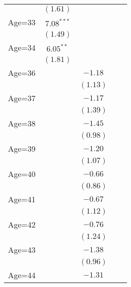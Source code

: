 \documentclass[fullpage]{paper}
\begin{document}
\begin{center}
\begin{longtable}{l c c c c }
            & $(1.61)$      &               &               &               \\
Age=33      & $7.08^{***}$  &               &               &               \\
            & $(1.49)$      &               &               &               \\
Age=34      & $6.05^{**}$   &               &               &               \\
            & $(1.81)$      &               &               &               \\
Age=36      &               & $-1.18$       &               &               \\
            &               & $(1.13)$      &               &               \\
Age=37      &               & $-1.17$       &               &               \\
            &               & $(1.39)$      &               &               \\
Age=38      &               & $-1.45$       &               &               \\
            &               & $(0.98)$      &               &               \\
Age=39      &               & $-1.20$       &               &               \\
            &               & $(1.07)$      &               &               \\
Age=40      &               & $-0.66$       &               &               \\
            &               & $(0.86)$      &               &               \\
Age=41      &               & $-0.67$       &               &               \\
            &               & $(1.12)$      &               &               \\
Age=42      &               & $-0.76$       &               &               \\
            &               & $(1.24)$      &               &               \\
Age=43      &               & $-1.38$       &               &               \\
            &               & $(0.96)$      &               &               \\
Age=44      &               & $-1.31$       &               &               \\

\end{longtable}
\end{center}
\end{document}
